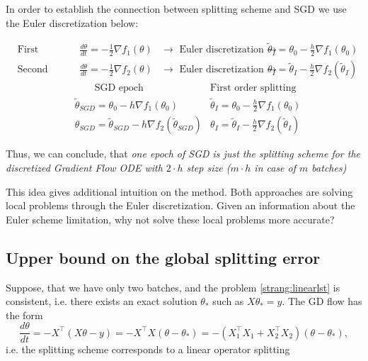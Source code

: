 \documentclass{article}
\begin{document}
In order to establish the connection between splitting scheme and SGD we use the Euler discretization below:

\begin{align*}
&\text{First splitting step: } &\frac{d \theta}{d t} = -\frac{1}{2}\nabla f_1(\theta)  &\to\text{ Euler discretization}\to &\tilde{\theta}_{I} = \theta_0 - \frac{h}{2}\nabla f_1 (\theta_0) \\
&\text{Second splitting step: } &\frac{d \theta}{d t} = -\frac{1}{2}\nabla f_2(\theta)  &\to\text{ Euler discretization}\to &\theta_{I} = \tilde{\theta}_{I} - \frac{h}{2}\nabla f_2 (\tilde{\theta}_{I})
\end{align*}
\begin{align*}
&\qquad\text{SGD epoch} &\text{First order splitting} \\
&\tilde{\theta}_{SGD} = \theta_0 - h \nabla f_1 (\theta_0) &\tilde{\theta}_{I} = \theta_0 - \frac{h}{2}\nabla f_1 (\theta_0) \\
&\theta_{SGD} = \tilde{\theta}_{SGD} - h \nabla f_2 (\tilde{\theta}_{SGD}) &\theta_{I} = \tilde{\theta}_{I} - \frac{h}{2}\nabla f_2 (\tilde{\theta}_{I})
\end{align*}

Thus, we can conclude, that \textit{one epoch of SGD is just the splitting scheme for the discretized Gradient Flow ODE with $2 \cdot h$ step size ($m \cdot h$ in case of $m$ batches)}

This idea gives additional intuition on the method. Both approaches are solving local problems through the Euler discretization. Given an information about the Euler scheme limitation, why not solve these local problems more accurate?

\subsection{Upper bound on the global splitting error}

Suppose, that we have only two batches, and the problem \eqref{strang:linearlst} is consistent, i.e. there exists an exact solution $\theta_*$ such as $X \theta_* = y$. The GD flow has the form
\begin{equation}\label{strang:model1}
    \frac{d \theta}{d t} = -X^{\top} (X \theta - y) = -X^{\top} X(\theta - \theta_*) = -(X_1^{\top} X_1 + X^{\top}_2 X_2)(\theta - \theta_*),
\end{equation}
i.e. the splitting scheme corresponds to a linear operator splitting
\end{document}
